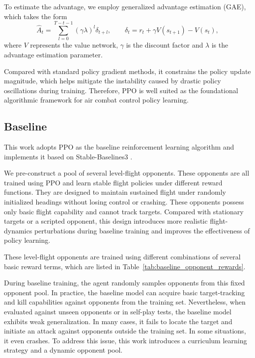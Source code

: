 \documentclass[pdflatex,sn-mathphys-num]{sn-jnl}%
\theoremstyle{thmstyleone}%
\theoremstyle{thmstyletwo}%
\theoremstyle{thmstylethree}%
\begin{document}
To estimate the advantage, we employ generalized advantage estimation (GAE), which takes the form
\begin{equation}
\hat{A}_t=\sum_{l=0}^{T-t-1}(\gamma\lambda)^l\delta_{t+l},
\qquad
\delta_t=r_t+\gamma V(s_{t+1})-V(s_t),
\end{equation}
where $V$ represents the value network, $\gamma$ is the discount factor and $\lambda$ is the advantage estimation parameter.

Compared with standard policy gradient methods, it constrains the policy update magnitude, which helps mitigate the instability caused by drastic policy oscillations during training. Therefore, PPO is well suited as the foundational algorithmic framework for air combat control policy learning.

\subsection{Baseline}

This work adopts PPO as the baseline reinforcement learning algorithm and implements it based on Stable-Baselines3 \cite{stable-baselines3}. 

We pre-construct a pool of several level-flight opponents. These opponents are all trained using PPO and learn stable flight policies under different reward functions. They are designed to maintain sustained flight under randomly initialized headings without losing control or crashing. These opponents possess only basic flight capability and cannot track targets. Compared with stationary targets or a scripted opponent, this design introduces more realistic flight-dynamics perturbations during baseline training and improves the effectiveness of policy learning.

These level-flight opponents are trained using different combinations of several basic reward terms, which are listed in Table~\ref{tab:baseline_opponent_rewards}.

During baseline training, the agent randomly samples opponents from this fixed opponent pool. In practice, the baseline model can acquire basic target-tracking and kill capabilities against opponents from the training set. Nevertheless, when evaluated against unseen opponents or in self-play tests, the baseline model exhibits weak generalization. In many cases, it fails to locate the target and initiate an attack against opponents outside the training set. In some situations, it even crashes. To address this issue, this work introduces a curriculum learning strategy and a dynamic opponent pool.
\end{document}
